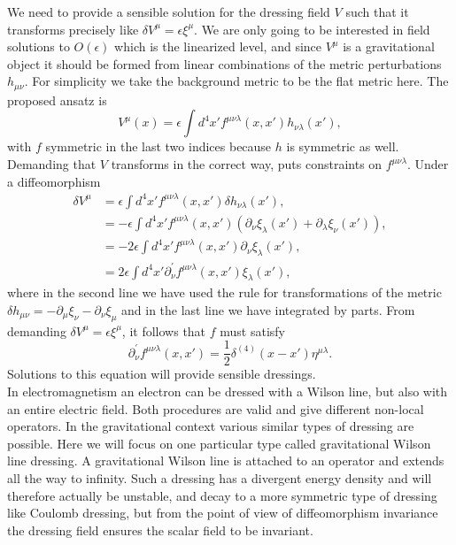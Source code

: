 \documentclass{PoS}
\newcommand{\LF}{\left(}
\newcommand{\RF}{\right)}
\begin{document}
We need to provide a sensible solution for the dressing field $V$ such that it transforms precisely like $\delta V^\mu = \epsilon \xi^\mu$. We are only going to be interested in field solutions to $O(\epsilon)$ which is the linearized level, and since $V^\mu$ is a gravitational object it should be formed from linear combinations of the metric perturbations $h_{\mu\nu}$. For simplicity we take the background metric to be the flat metric here. The proposed ansatz is
\begin{equation}
V^{\mu} (x) = \epsilon \int d^4 x' f^{\mu\nu\lambda}(x,x') h_{\nu\lambda}(x'),
\end{equation}
with $f$ symmetric in the last two indices because $h$ is symmetric as well. Demanding that $V$ transforms in the correct way, puts constraints on $f^{\mu\nu\lambda}$. Under a diffeomorphism
\begin{align}
\delta V^{\mu} &= \epsilon\int d^4 x' f^{\mu\nu\lambda}(x,x') \delta h_{\nu\lambda}(x'),\\
&= - \epsilon \int d^4 x' f^{\mu\nu\lambda}(x,x')\LF \partial_\nu \xi_\lambda(x') + \partial_\lambda \xi_\nu(x')\RF,\\
&= -2\epsilon \int d^4 x' f^{\mu\nu\lambda}(x,x') \partial_\nu \xi_\lambda (x'),\\
&= 2\epsilon \int d^4 x' \partial_\nu^{'} f^{\mu\nu\lambda}(x,x') \xi_\lambda (x'),
\end{align}
where in the second line we have used the rule for transformations of the metric $\delta h_{\mu\nu} = -\partial_\mu \xi_\nu - \partial_\nu \xi_\mu$ and in the last line we have integrated by parts. From demanding $\delta V^\mu= \epsilon \xi^\mu$, it follows that $f$ must satisfy
\begin{equation}
\partial^{'}_\nu f^{\mu\nu\lambda} (x,x') = \frac{1}{2}\delta^{(4)}(x-x') \eta^{\mu \lambda}.
\label{eq:constraint}
\end{equation}
Solutions to this equation will provide sensible dressings.\\

In electromagnetism an electron can be dressed with a Wilson line, but also with an entire electric field. Both procedures are valid and give different non-local operators. In the gravitational context various similar types of dressing are possible. Here we will focus on one particular type called gravitational Wilson line dressing. A gravitational  Wilson line is attached to an operator and extends all the way to infinity. Such a dressing has a divergent energy density and will therefore actually be unstable, and decay to a more symmetric type of dressing like Coulomb dressing, but from the point of view of diffeomorphism invariance the dressing field ensures the scalar field to be invariant.\\
\end{document}

